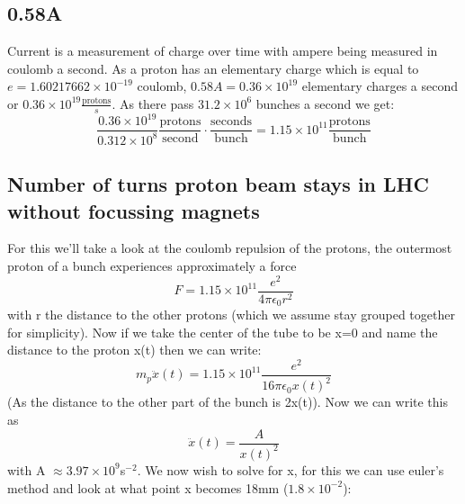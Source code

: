 \documentclass[10pt,a4paper,twoside]{article}
\begin{document}
\subsection{0.58A}
Current is a measurement of charge over time with ampere being measured in coulomb a second. As a proton has an elementary charge which is equal to $e = 1.60217662 \times 10^{-19}$ coulomb, $0.58A = 0.36\times10^{19}$ elementary charges a second or $0.36\times10^{19}\frac{\text{protons}}{s}$. As there pass $31.2\times10^{6}$ bunches a second we get:
\begin{equation}
	\frac{0.36\times10^{19}}{0.312\times10^{8}}\frac{\text{protons}}{\text{second}}\cdot\frac{\text{seconds}}{\text{bunch}} = 1.15\times10^{11}\frac{\text{protons}}{\text{bunch}}
\end{equation}
\subsection{Number of turns proton beam stays in LHC without focussing magnets}
For this we'll take a look at the coulomb repulsion of the protons, the outermost proton of a bunch experiences approximately a force
\begin{equation}
	F = 1.15\times10^{11}\frac{e^2}{4\pi\epsilon_0r^2}
\end{equation}
with r the distance to the other protons (which we assume stay grouped together for simplicity). Now if we take the center of the tube to be x=0 and name the distance to the proton x(t) then we can write:
\begin{equation}
	m_{p}\ddot{x}(t) = 1.15\times10^{11}\frac{e^2}{16\pi\epsilon_0x(t)^2}
\end{equation}
(As the distance to the other part of the bunch is 2x(t)). Now we can write this as
\begin{equation}
	\ddot{x}(t) = \frac{A}{x(t)^2}
\end{equation}
with A $\approx 3.97\times10^9$s$^{-2}$. We now wish to solve for x, for this we can use euler's method and look at what point x becomes 18mm ($1.8\times10^{-2}$):
\end{document}

